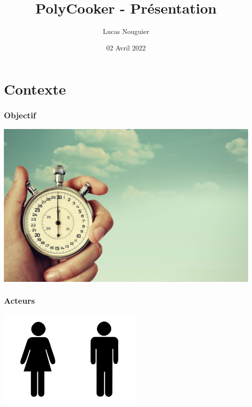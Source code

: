 \documentclass{beamer}
\title[PolyCooker]{PolyCooker - Présentation}
\author{Lucas Nouguier}
\institute[]{Polytech Montpellier}
\date{02 Avril 2022}
\begin{document}
\frame{\titlepage}

\section{Contexte}
\begin{frame}
	\frametitle{Objectif}
	\centering
	\includegraphics[height=0.6\textheight]{optiTemps.jpg}
\end{frame}

\begin{frame}
	\frametitle{Acteurs}
	\centering
	\includegraphics[scale=0.5]{logoHommeFemme.png}
\end{frame}
\end{document}
